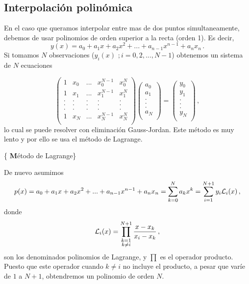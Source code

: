 \documentclass[
]{agujournal2019}
\begin{document}
\subsection{Interpolación
polinómica}\label{interpolaciuxf3n-polinuxf3mica}

En el caso que queramos interpolar entre mas de dos puntos
simultaneamente, debemos de usar polinomios de orden superior a la recta
(orden 1). Es decir,
\[y(x)=a_0 + a_1 x + a_2 x^2 + ... + a_{n-1}x^{n-1} + a_n x_n\,.\] Si
tomamos \(N\) observaciones (\(y_i(x)\,\,;i=0,2,...,N-1\)) obtenemos un
sistema de \(N\) ecuaciones

\[\left(\begin{array}{ccccc}
  1 & x_0 & ... & x_0^{N-1} & x_0^N\\
  1 & x_1 & ... & x_1^{N-1} & x_1^N\\
  . & . & . & . & .\\
  . & . & . & . & .\\
  . & . & . & . & .\\
  1 & x_N & ... & x_N^{N-1} & x_N^N\\
     \end{array}\right)
    \left(\begin{array}{c}
  a_0 \\
  a_1 \\
  . \\
  . \\
  . \\
  a_N \\
     \end{array}\right)=
     \left(\begin{array}{c}
  y_0 \\
  y_1 \\
  . \\
  . \\
  . \\
  y_N \\
     \end{array}\right)\,,\] lo cual se puede resolver con eliminación
Gauss-Jordan. Este método es muy lento y por ello se usa el método de
Lagrange.

\vspace{0.5cm}

\{ \textbf Método de Lagrange\}

De nuevo asumimos
\[p(x)=a_0 + a_1 x + a_2 x^2 + ... + a_{n-1}x^{n-1} + a_n x_n=\sum\limits^{N}_{k=0} a_k x^k
=\sum^{N+1}_{i=1} y_i {\cal L}_i(x)\,,\] donde
\[{\cal L}_i(x)=\prod^{N+1}_{\substack{k=1\\ k\ne i}} \frac{x-x_k}{x_i-x_k}\,,\]
son los denominados polinomios de Lagrange, y \(\prod\) es el operador
producto. Puesto que este operador cuando \(k\ne i\) no incluye el
producto, a pesar que varíe de \(1\) a \(N+1\), obtendremos un polinomio
de orden \(N\).
\end{document}
